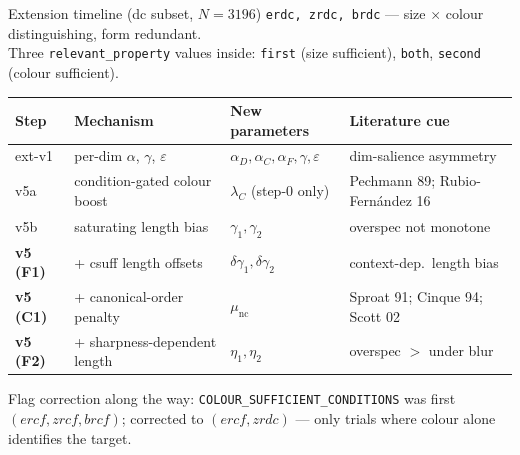 \documentclass[10pt,aspectratio=169]{beamer}
\newcommand{\main}[1]{\textcolor{CSP-main-dark}{\textbf{#1}}}
\newcommand{\emp}[1]{\textcolor{CSP-emphasis}{\textbf{#1}}}
\newcommand{\acct}[1]{\textcolor{CSP-accent-1-dark}{#1}}      %
\newcommand{\accy}[1]{\textcolor{CSP-accent-2-dark}{#1}}      %
\newcommand{\accg}[1]{\textcolor{CSP-accent-3-dark}{#1}}      %
\newcommand{\muted}[1]{\textcolor{CSP-text-light}{#1}}
\begin{document}
\begin{frame}{Extension timeline (dc subset, $N = 3196$)}
\footnotesize
\texttt{erdc, zrdc, brdc} --- size $\times$ colour distinguishing, form redundant.\\
Three \texttt{relevant\_property} values inside: \acct{\texttt{first}} (size sufficient), \accg{\texttt{both}}, \accy{\texttt{second}} (colour sufficient).

\vspace{0.6em}
\begin{center}
\renewcommand{\arraystretch}{1.25}
\begin{tabular}{llll}
\toprule
Step & Mechanism & New parameters & Literature cue\\
\midrule
ext-v1 & per-dim $\alpha$, $\gamma$, $\varepsilon$  & $\alpha_D,\alpha_C,\alpha_F,\gamma,\varepsilon$ & dim-salience asymmetry\\
\acct{v5a}    & condition-gated colour boost                       & $\lambda_C$ (step-0 only) & Pechmann 89; Rubio-Fern\'andez 16\\
\acct{v5b}    & saturating length bias                             & $\gamma_1, \gamma_2$ & overspec not monotone\\
\main{v5 (F1)} & + csuff length offsets                            & $\delta\gamma_1, \delta\gamma_2$ & context-dep.\ length bias\\
\main{v5 (C1)} & + canonical-order penalty                         & $\mu_\mathrm{nc}$ & Sproat 91; Cinque 94; Scott 02\\
\emp{v5 (F2)}  & + sharpness-dependent length                      & $\eta_1, \eta_2$ & overspec $>$ under blur\\
\bottomrule
\end{tabular}
\end{center}

\vspace{0.5em}
\muted{Flag correction along the way:} \texttt{COLOUR\_SUFFICIENT\_CONDITIONS}
was first $(ercf, zrcf, brcf)$; corrected to $(ercf, zrdc)$ --- only trials where colour alone identifies the target.
\end{frame}
\end{document}

